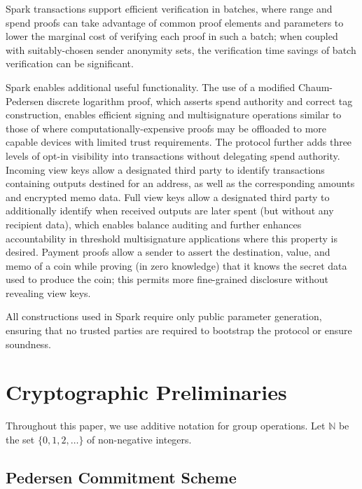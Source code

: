 \documentclass{llncs}
\begin{document}
Spark transactions support efficient verification in batches, where range and spend proofs can take advantage of common proof elements and parameters to lower the marginal cost of verifying each proof in such a batch; when coupled with suitably-chosen sender anonymity sets, the verification time savings of batch verification can be significant.

Spark enables additional useful functionality.
The use of a modified Chaum-Pedersen discrete logarithm proof, which asserts spend authority and correct tag construction, enables efficient signing and multisignature operations similar to those of \cite{musig,frost,schnorrwithschnorr,bellare_frost} where computationally-expensive proofs may be offloaded to more capable devices with limited trust requirements.
The protocol further adds three levels of opt-in visibility into transactions without delegating spend authority.
Incoming view keys allow a designated third party to identify transactions containing outputs destined for an address, as well as the corresponding amounts and encrypted memo data.
Full view keys allow a designated third party to additionally identify when received outputs are later spent (but without any recipient data), which enables balance auditing and further enhances accountability in threshold multisignature applications where this property is desired.
Payment proofs allow a sender to assert the destination, value, and memo of a coin while proving (in zero knowledge) that it knows the secret data used to produce the coin; this permits more fine-grained disclosure without revealing view keys.

All constructions used in Spark require only public parameter generation, ensuring that no trusted parties are required to bootstrap the protocol or ensure soundness.


\section{Cryptographic Preliminaries}

Throughout this paper, we use additive notation for group operations.
Let $\mathbb{N}$ be the set $\{0,1,2,\ldots\}$ of non-negative integers.


\subsection{Pedersen Commitment Scheme}
\end{document}
